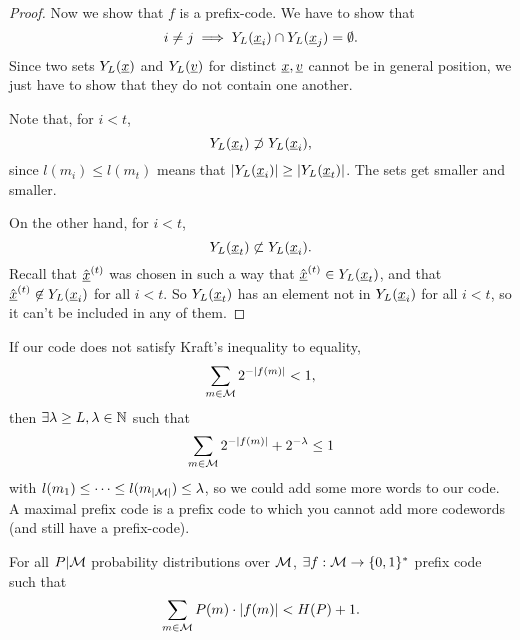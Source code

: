 \begin{proof}
	Now we show that $f$ is a prefix-code.
	We have to show that
	\begin{equation*}
		i \neq j \implies Y_L(\underline{x}_i) \cap Y_L(\underline{x}_j) = \emptyset.
	\end{equation*}
	Since two sets $Y_L(\underline{x})$ and $Y_L(\underline{v})$ for distinct $\underline{x}, \underline{v}$ cannot be in general position, we just have to show that they do not contain one another.

	Note that, for $i < t$,
	\begin{equation*}
		Y_L(\underline{x}_t) \not\supset Y_L(\underline{x}_i),
	\end{equation*}
	since $l(m_i) \le l(m_t)$ means that $\left|{Y_L(\underline{x}_i)}\right| \ge \left|{Y_L(\underline{x}_t)}\right|$.
	The sets get smaller and smaller.

	On the other hand, for $i < t$,
	\begin{equation*}
		Y_L(\underline{x}_t) \not\subset Y_L(\underline{x}_i).
	\end{equation*}
	Recall that $\hat{\underline{x}}^{(t)}$ was chosen in such a way that $\hat{\underline{x}}^{(t)} \in Y_L(\underline{x}_t)$, and that $\hat{\underline{x}}^{(t)} \not\in Y_L(\underline{x}_i)$ for all $i < t$.
	So $Y_L(\underline{x}_t)$ has an element not in $Y_L(\underline{x}_i)$ for all $i < t$, so it can't be included in any of them.
\end{proof}

If our code does not satisfy Kraft's inequality to equality, \ie
\begin{equation*}
	\sum_{m \in \mathcal{M}} 2^{-\left|{f(m)}\right|} < 1,
\end{equation*}
then $\exists \lambda \ge L, \lambda \in \mathbb{N}$  such that
\begin{equation*}
	\sum_{m \in \mathcal{M}} 2^{-\left|{f(m)}\right|} + 2^{-\lambda} \le 1
\end{equation*}
with $l(m_1) \le \dots \le l(m_{\left|{\mathcal{M}}\right|}) \le \lambda$, so we could add some more words to our code.
A maximal prefix code is a prefix code to which you cannot add more codewords (and still have a prefix-code).

\begin{prop}
	For all $P|\mathcal{M}$ probability distributions over $\mathcal{M}$, $\exists f : \mathcal{M} \to \{0, 1\}^*$ prefix code such that
	\begin{equation*}
		\sum_{m \in \mathcal{M}} P(m) \cdot \left|{f(m)}\right| < H(P) + 1.
	\end{equation*}
\end{prop}

